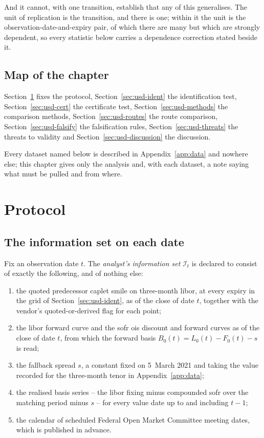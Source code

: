 \documentclass[../../../main.tex]{subfiles}
\begin{document}
And it cannot, with one transition, establish that any of this generalises. The unit of replication is the transition, and there is one; within it the unit is the observation-date-and-expiry pair, of which there are many but which are strongly dependent, so every statistic below carries a dependence correction stated beside it.

\subsection{Map of the chapter}

Section~\ref{sec:usd-protocol} fixes the protocol, Section~\ref{sec:usd-ident} the identification test, Section~\ref{sec:usd-cert} the certificate test, Section~\ref{sec:usd-methods} the comparison methods, Section~\ref{sec:usd-routes} the route comparison, Section~\ref{sec:usd-falsify} the falsification rules, Section~\ref{sec:usd-threats} the threats to validity and Section~\ref{sec:usd-discussion} the discussion.

Every dataset named below is described in Appendix~\ref{app:data} and nowhere else; this chapter gives only the analysis and, with each dataset, a note saying what must be pulled and from where.

\section{Protocol}\label{sec:usd-protocol}

\subsection{The information set on each date}

Fix an observation date $t$. The \emph{analyst's information set} $\mathcal I_t$ is declared to consist of exactly the following, and of nothing else:
\begin{enumerate}[nosep,label=(\alph*)]
\item the quoted predecessor caplet smile on three-month \gls{libor}, at every expiry in the grid of Section~\ref{sec:usd-ident}, as of the close of date $t$, together with the vendor's quoted-or-derived flag for each point;
\item the \gls{libor} forward curve and the \gls{sofr} \gls{ois} discount and forward curves as of the close of date $t$, from which the forward basis $B_0(t)=L_0(t)-F_0(t)-s$ is read;
\item the fallback spread $s$, a constant fixed on 5~March 2021 and taking the value recorded for the three-month tenor in Appendix~\ref{app:data};
\item the realised basis series -- the \gls{libor} fixing minus compounded \gls{sofr} over the matching period minus $s$ -- for every value date up to and including $t-1$;
\item the calendar of scheduled Federal Open Market Committee meeting dates, which is published in advance.
\end{enumerate}
\end{document}
